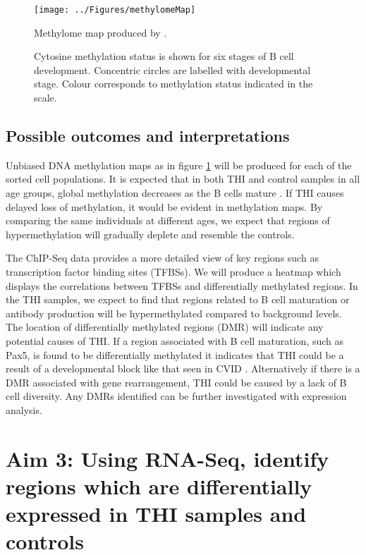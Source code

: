 \documentclass[12pt]{article}
\begin{document}
	\begin{figure}[tb]
		\centering
			\texttt{[image: ../Figures/methylomeMap]}
			\caption{Methylome map produced by \citet{Kulis15}. }
			\label{fig:MethMap}

		\caption{Cytosine methylation status is shown for six stages of B cell development. Concentric circles are labelled with developmental stage. Colour corresponds to methylation status indicated in the scale.}
	\end{figure}
			
		
		\subsection{Possible outcomes and interpretations}

			Unbiased DNA methylation maps as in figure \ref{fig:MethMap} will be produced for each of the sorted cell populations.
			It is expected that in both THI and control samples in all age groups, global methylation decreases as the B cells mature \citep{Kulis15,Lai13,Kulis12,Shaknovich11}. 
			If THI causes delayed loss of methylation, it would be evident in methylation maps.
			By comparing the same individuals at different ages, we expect that regions of hypermethylation will gradually deplete and resemble the controls.
			
			The ChIP-Seq data provides a more detailed view of key regions such as transcription factor binding sites (TFBSs).
			We will produce a heatmap which displays the correlations between TFBSs and differentially methylated regions. 
			In the THI samples, we expect to find that regions related to B cell maturation or antibody production will be hypermethylated compared to background levels. 
			The location of differentially methylated regions (DMR) will indicate any potential causes of THI.
			If a region associated with B cell maturation, such as Pax5, is found to be differentially methylated it indicates that THI could be a result of a developmental block like that seen in CVID \citep{Tallmadge15}.
			Alternatively if there is a DMR associated with gene rearrangement, THI could be caused by a lack of B cell diversity.
			Any DMRs identified can be further investigated with expression analysis.
			
		
	\section{Aim 3: {\large Using RNA-Seq, identify regions which are differentially expressed in THI samples and controls}}
	
\end{document}
